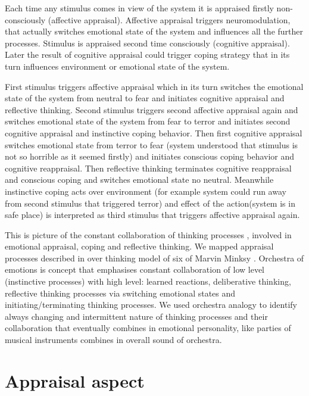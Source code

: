 Each time any stimulus comes in view of the system it is appraised firstly non-consciously (affective appraisal). Affective appraisal triggers neuromodulation, that actually switches emotional state of the system and influences all the further processes. Stimulus is appraised second time consciously (cognitive appraisal). Later the result of cognitive appraisal could trigger coping strategy that in its turn influences environment or emotional state of the system.

First stimulus triggers affective appraisal which in its turn switches the emotional state of the system from neutral to fear and initiates cognitive appraisal and reflective thinking. Second stimulus triggers second affective appraisal again and switches emotional state of the system from fear to terror and initiates second cognitive appraisal and instinctive coping behavior. Then first cognitive appraisal switches emotional state from terror to fear (system understood that stimulus is not so horrible as it seemed firstly) and initiates conscious coping behavior and cognitive reappraisal. Then reflective thinking terminates cognitive reappraisal and conscious coping and switches emotional state no neutral. Meanwhile instinctive coping acts over environment (for example system could run away from second stimulus that triggered terror) and effect of the action(system is in safe place) is interpreted as third stimulus that triggers affective appraisal again.

This is picture of the constant collaboration of thinking processes \cite{emotionmachine}, involved in emotional appraisal, coping and reflective thinking. We mapped appraisal processes described in \cite{putting_appraisal_in_context, appraisal_determinants_of_emotions, appraisal_considered_as_a_process} over thinking model of six of Marvin Minksy \cite{emotionmachine}. Orchestra of emotions is concept that emphasises constant collaboration of low level (instinctive processes) with high level: learned reactions, deliberative thinking, reflective thinking processes via switching emotional states and initiating/terminating thinking processes. We used orchestra analogy to identify always changing and intermittent nature of thinking processes and their  collaboration that eventually combines in emotional personality, like parties of musical instruments combines in overall sound of orchestra.

\section{Appraisal aspect}

